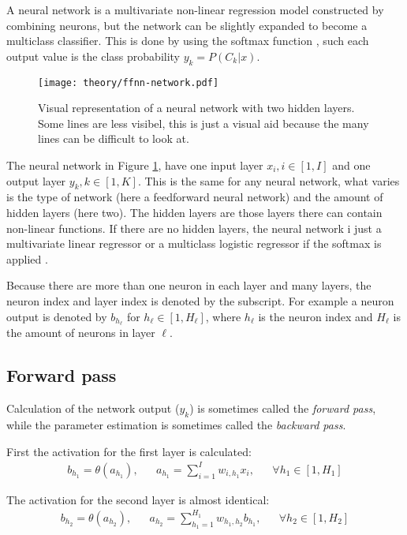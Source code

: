 A neural network is a multivariate non-linear regression model constructed by combining neurons, but the network can be slightly expanded to become a multiclass classifier. This is done by using the softmax function \cite{the-elements-of-statistical-learning}, such each output value is the class probability $y_k = P(C_k | x)$.

\begin{figure}[h]
	\centering
	\texttt{[image: theory/ffnn-network.pdf]}
	\caption{Visual representation of a neural network with two hidden layers. Some lines are less visibel, this is just a visual aid because the many lines can be difficult to look at.}
	\label{fig:theory:ffnn:network}
\end{figure}

The neural network in Figure \ref{fig:theory:ffnn:network}, have one input layer $x_i, i \in [1, I]$ and one output layer $y_k, k \in [1, K]$. This is the same for any neural network, what varies is the type of network (here a feedforward neural network) and the amount of hidden layers (here two). The hidden layers are those layers there can contain non-linear functions. If there are no hidden layers, the neural network i just a multivariate linear regressor or a multiclass logistic regressor if the softmax is applied \cite{bishop}.

Because there are more than one neuron in each layer and many layers, the neuron index and layer index is denoted by the subscript. For example a neuron output is denoted by $b_{h_{\ell}}$ for $h_{\ell} \in [1, H_{\ell}]$, where $h_{\ell}$ is the neuron index and $H_\ell$ is the amount of neurons in layer $\ell$.

\subsection{Forward pass}

Calculation of the network output ($y_k$) is sometimes called the \textit{forward pass}, while the parameter estimation is sometimes called the \textit{backward pass}.

First the activation for the first layer is calculated:
\begin{equation}
\begin{aligned}
b_{h_1} = \theta(a_{h_1}), && a_{h_1} = \sum_{i = 1}^I w_{i, h_1} x_i, && \forall h_1 \in [1, H_1]
\end{aligned}
\end{equation}

The activation for the second layer is almost identical:
\begin{equation}
\begin{aligned}
b_{h_2} = \theta(a_{h_2}), && a_{h_2} = \sum_{h_1 = 1}^{H_1} w_{h_1, h_2} b_{h_1}, && \forall h_2 \in [1, H_2]
\end{aligned}
\end{equation}

